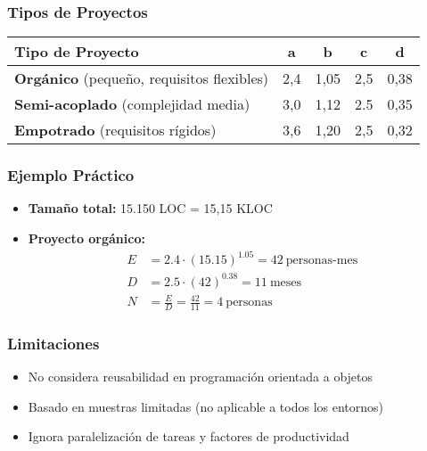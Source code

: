 \subsubsection{Tipos de Proyectos}
\label{subsubsec:tipos-proyectos}

\begin{center}
    \begin{tabular}{lcccc}
        \toprule
        \textbf{Tipo de Proyecto}                         & \textbf{a} & \textbf{b} & \textbf{c} & \textbf{d} \\
        \midrule
        \textbf{Orgánico} (pequeño, requisitos flexibles) & 2,4        & 1,05       & 2,5        & 0,38       \\
        \textbf{Semi-acoplado} (complejidad media)         & 3,0        & 1,12       & 2.5        & 0,35       \\
        \textbf{Empotrado} (requisitos rígidos)           & 3,6        & 1,20       & 2,5        & 0,32       \\
        \bottomrule
    \end{tabular}
\end{center}

\subsubsection{Ejemplo Práctico}
\label{subsubsec:ejemplo-cocomo}

\begin{itemize}
    \item \textbf{Tamaño total:} 15.150 LOC = 15,15 KLOC
    \item \textbf{Proyecto orgánico:}
    \begin{align*}
        E &= 2.4 \cdot (15.15)^{1.05} = 42\ \text{personas-mes} \\
        D &= 2.5 \cdot (42)^{0.38} = 11\ \text{meses} \\
        N &= \frac{E}{D} = \frac{42}{11} = 4\ \text{personas}
    \end{align*}
\end{itemize}

\subsubsection{Limitaciones}
\label{subsubsec:limitaciones-cocomo}

\begin{itemize}
    \item No considera reusabilidad en programación orientada a objetos
    \item Basado en muestras limitadas (no aplicable a todos los entornos)
    \item Ignora paralelización de tareas y factores de productividad
\end{itemize}

